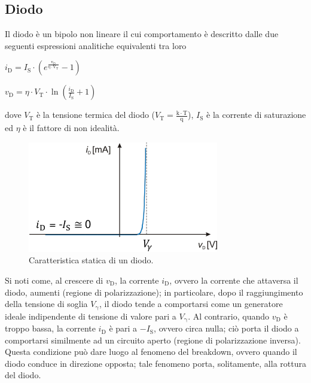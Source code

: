\documentclass[a4paper]{article}
\begin{document}
		\subsection{Diodo}
			Il diodo è un bipolo non lineare il cui comportamento è descritto dalle due seguenti espressioni analitiche equivalenti tra loro
			\newline
			\begin{center}
				$ i_{\mathrm{D}} = I_{\mathrm{S}} \cdot (e^{\mathrm{\frac{v_{\mathrm{D}}}{\eta \cdot V_{\mathrm{T}}}}} - 1) $
			\end{center}
			\newline
			\begin{center}
				$ v_{\mathrm{D}} = \eta \cdot V_{\mathrm{T}} \cdot \ln (\frac{i_{\mathrm{D}}}{I_{\mathrm{S}}} + 1) $
			\end{center}
			dove $ V_{\mathrm{T}} $ è la tensione termica del diodo ($ V_{\mathrm{T}} = \frac{\mathrm{k \cdot T}}{\mathrm{q}} $), $ I_{\mathrm{S}} $ è la corrente di saturazione ed $ \eta $ è il fattore di non idealità.
			\begin{figure}[h!]
				\centering
				\includegraphics[scale=0.7]{caratteristicaStatica}
				\caption{Caratteristica statica di un diodo.}
				\label{fig:caratteristicaStatica}
			\end{figure}
			\newpage
			Si noti come, al crescere di $ v_{\mathrm{D}} $, la corrente $ i_{\mathrm{D}} $, ovvero la corrente che attaversa il diodo, aumenti (regione di polarizzazione); in particolare, dopo il raggiungimento della tensione di soglia $ V_{\mathrm{\gamma}} $, il diodo tende a comportarsi come un generatore ideale indipendente di tensione di valore pari a $ V_{\mathrm{\gamma}} $.
			\newline
			Al contrario, quando $ v_{\mathrm{D}} $ è troppo bassa, la corrente $ i_{\mathrm{D}} $ è pari a $ -I_{\mathrm{S}} $, ovvero circa nulla; ciò porta il diodo a comportarsi similmente ad un circuito aperto (regione di polarizzazione inversa). Questa condizione può dare luogo al fenomeno del breakdown, ovvero quando il diodo conduce in direzione opposta; tale fenomeno porta, solitamente, alla rottura del diodo.
\end{document}
